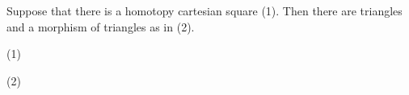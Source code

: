     \begin{lemma}
        Suppose that there is a homotopy cartesian square (1). Then there are triangles and a morphism of triangles as in (2).
        \begin{center}
            (1)
            (2)
        \end{center}
    \end{lemma}

